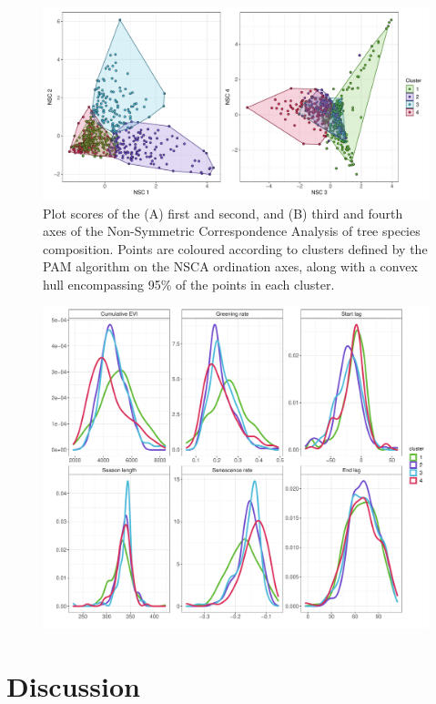 \documentclass[11pt,a4paper]{article}
\begin{document}
\begin{figure}[H]
\centering
	\includegraphics[width=\textwidth]{nsca.pdf}
	\caption{Plot scores of the (A) first and second, and (B) third and fourth axes of the Non-Symmetric Correspondence Analysis of tree species composition. Points are coloured according to clusters defined by the PAM algorithm on the NSCA ordination axes, along with a convex hull encompassing 95\% of the points in each cluster.}
	\label{nsca}
\end{figure}

\begin{figure}[H]
\centering
	\includegraphics[width=\textwidth]{phen_dens_clust}
	\caption{}
	\label{phen_dens_clust}
\end{figure}

\section{Discussion}
\end{document}
